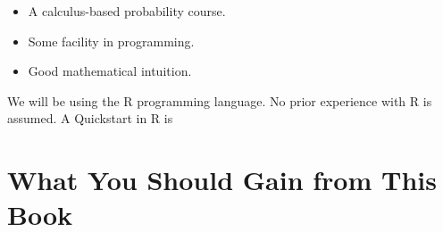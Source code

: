 \begin{itemize}

\item A calculus-based probability course.

\item Some facility in programming.  

\item Good mathematical intuition.

\end{itemize} 

We will be using the R programming language.  No prior experience with R
is assumed.  A Quickstart in R is 

\section{What You Should Gain from This Book}

